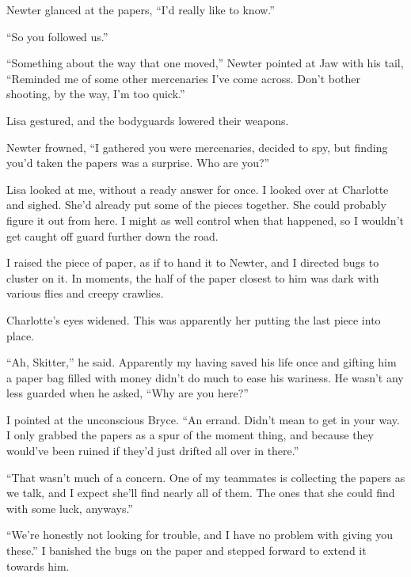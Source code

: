 Newter glanced at the papers, ``I'd really like to know.''



``So you followed us.''



``Something about the way that one moved,'' Newter pointed at Jaw with his tail, ``Reminded me of some other mercenaries I've come across.  Don't bother shooting, by the way, I'm too quick.''



Lisa gestured, and the bodyguards lowered their weapons.



Newter frowned, ``I gathered you were mercenaries, decided to spy, but finding you'd taken the papers was a surprise.  Who are you?''



Lisa looked at me, without a ready answer for once.  I looked over at Charlotte and sighed.  She'd already put some of the pieces together.  She could probably figure it out from here.  I might as well control when that happened, so I wouldn't get caught off guard further down the road.



I raised the piece of paper, as if to hand it to Newter, and I directed bugs to cluster on it.  In moments, the half of the paper closest to him was dark with various flies and creepy crawlies.



Charlotte's eyes widened.  This was apparently her putting the last piece into place.



``Ah, Skitter,'' he said.  Apparently my having saved his life once and gifting him a paper bag filled with money didn't do much to ease his wariness.  He wasn't any less guarded when he asked, ``Why are you here?''



I pointed at the unconscious Bryce.  ``An errand.  Didn't mean to get in your way.  I only grabbed the papers as a spur of the moment thing, and because they would've been ruined if they'd just drifted all over in there.''



``That wasn't much of a concern.  One of my teammates is collecting the papers as we talk, and I expect she'll find nearly all of them.  The ones that she could find with some luck, anyways.''



``We're honestly not looking for trouble, and  I have no problem with giving you these.'' I banished the bugs on the paper and stepped forward to extend it towards him.



